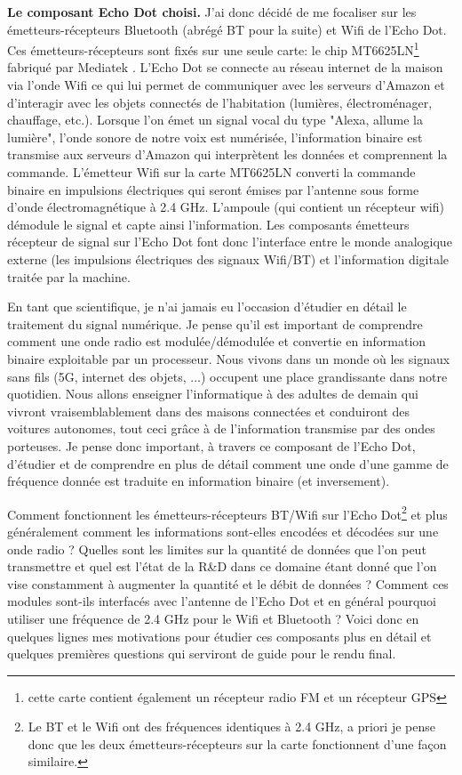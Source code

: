 \documentclass[12pt,svgnames]{article}
\begin{document}
 
\textbf{Le composant Echo Dot choisi.}
J'ai donc décidé de me focaliser sur les émetteurs-récepteurs Bluetooth (abrégé BT pour la suite) et Wifi de l'Echo Dot. Ces émetteurs-récepteurs sont fixés sur une seule carte: le chip MT6625LN\footnote{cette carte contient également un récepteur radio FM et un récepteur GPS} fabriqué par Mediatek \cite{MT6625LN} . L'Echo Dot se connecte au réseau internet de la maison via l'onde Wifi ce qui lui permet de communiquer avec les serveurs d'Amazon et d'interagir avec les objets connectés de l'habitation (lumières, électroménager, chauffage, etc.). Lorsque l'on émet un signal vocal du type "Alexa, allume la lumière", l'onde sonore de notre voix est numérisée, l'information binaire est transmise aux serveurs d'Amazon qui interprètent les données et comprennent la commande. L'émetteur Wifi sur la carte MT6625LN converti la commande binaire en impulsions électriques qui seront émises par l'antenne sous forme d'onde électromagnétique à 2.4 GHz. L'ampoule (qui contient un récepteur wifi) démodule le signal et capte ainsi l'information.
Les composants émetteurs récepteur de signal sur l'Echo Dot font donc l'interface entre le monde analogique externe (les impulsions électriques des signaux Wifi/BT) et l'information digitale traitée par la machine.

En tant que scientifique, je n'ai jamais eu l'occasion d'étudier en détail le traitement du signal numérique. Je pense qu'il est important de comprendre comment une onde radio est modulée/démodulée et convertie en information binaire exploitable par un processeur. Nous vivons dans un monde où les signaux sans fils (5G, internet des objets, ...) occupent une place grandissante dans notre quotidien. Nous allons enseigner l'informatique à des adultes de demain qui vivront vraisemblablement dans des maisons connectées et conduiront des voitures autonomes, tout ceci grâce à de l'information transmise par des ondes porteuses. Je pense donc important, à travers ce composant de l'Echo Dot, d'étudier et de comprendre en plus de détail comment une onde d'une gamme de fréquence donnée est traduite en information binaire (et inversement).


Comment fonctionnent les émetteurs-récepteurs BT/Wifi sur l'Echo Dot\footnote{Le BT et le Wifi ont des fréquences identiques à 2.4 GHz, a priori je pense donc que les deux émetteurs-récepteurs sur la carte fonctionnent d'une façon similaire.} et plus généralement comment les informations sont-elles encodées et décodées sur une onde radio ? Quelles sont les limites sur la quantité de données que l'on peut transmettre et quel est l'état de la R\&D dans ce domaine étant donné que l'on vise constamment à augmenter la quantité et le débit de données ?
Comment ces modules sont-ils interfacés avec l'antenne de l'Echo Dot et en général pourquoi utiliser une fréquence de 2.4 GHz pour le Wifi et Bluetooth ?
Voici donc en quelques lignes mes motivations pour étudier ces composants plus en détail et quelques premières questions qui serviront de guide pour le rendu final.
\end{document}
